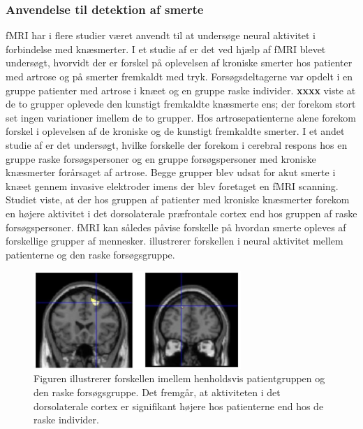 \subsubsection{Anvendelse til detektion af smerte}
fMRI har i flere studier været anvendt til at undersøge neural aktivitet i forbindelse med knæsmerter.
I et studie af \citep{Parks2012} er det ved hjælp af fMRI blevet undersøgt, hvorvidt der er forskel på oplevelsen af kroniske smerter hos patienter med artrose og på smerter fremkaldt med tryk. Forsøgsdeltagerne var opdelt i en gruppe patienter med artrose i knæet og en gruppe raske individer. \textbf{xxxx} viste at de to grupper oplevede den kunstigt fremkaldte knæsmerte ens; der forekom stort set ingen variationer imellem de to grupper. Hos artrosepatienterne alene forekom forskel i oplevelsen af de kroniske og de kunstigt fremkaldte smerter. \citep{Parks2012} 
I et andet studie af \citep{Hiramatsu2014} er det undersøgt, hvilke forskelle der forekom i cerebral respons hos en gruppe raske forsøgspersoner og en gruppe forsøgspersoner med kroniske knæsmerter forårsaget af artrose. Begge grupper blev udsat for akut smerte i knæet gennem invasive elektroder imens der blev foretaget en fMRI scanning. Studiet viste, at der hos gruppen af patienter med kroniske knæsmerter forekom en højere aktivitet i det dorsolaterale præfrontale cortex end hos gruppen af raske forsøgspersoner. \citep{Hiramatsu2014} 
fMRI kan således påvise forskelle på hvordan smerte opleves af forskellige grupper af mennesker.  illustrerer forskellen i neural aktivitet mellem patienterne og den raske forsøgsgruppe.
\begin{figure}[H] 
	\begin{center}
		\includegraphics[width=0.7\textwidth]{figures/bProblemanalyse/fMRI_dorsolateral}
	\end{center}
	\caption{Figuren illustrerer forskellen imellem henholdsvis patientgruppen og den raske forsøgsgruppe. Det fremgår, at aktiviteten i det dorsolaterale cortex er signifikant højere hos patienterne end hos de raske individer. \citep{Hiramatsu2014}} 
	\label{fig:fMRI_result} 
\end{figure} 

